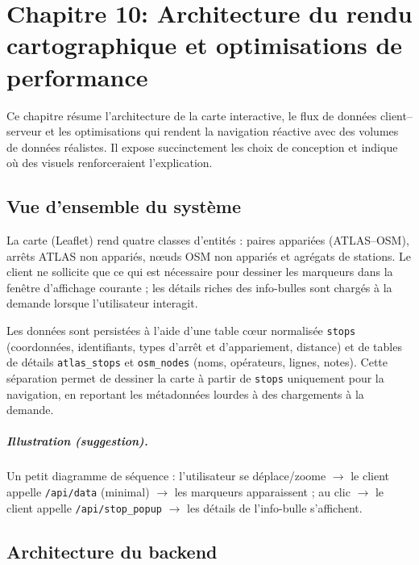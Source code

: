 \chapter{Chapitre 10: Architecture du rendu cartographique et optimisations de performance}

Ce chapitre résume l’architecture de la carte interactive, le flux de données client–serveur et les optimisations qui rendent la navigation réactive avec des volumes de données réalistes. Il expose succinctement les choix de conception et indique où des visuels renforceraient l’explication.

\section{Vue d’ensemble du système}
La carte (Leaflet) rend quatre classes d’entités : paires appariées (ATLAS–OSM), arrêts ATLAS non appariés, nœuds OSM non appariés et agrégats de stations. Le client ne sollicite que ce qui est nécessaire pour dessiner les marqueurs dans la fenêtre d’affichage courante ; les détails riches des info-bulles sont chargés à la demande lorsque l’utilisateur interagit.

Les données sont persistées à l’aide d’une table cœur normalisée \texttt{stops} (coordonnées, identifiants, types d’arrêt et d’appariement, distance) et de tables de détails \texttt{atlas\_stops} et \texttt{osm\_nodes} (noms, opérateurs, lignes, notes). Cette séparation permet de dessiner la carte à partir de \texttt{stops} uniquement pour la navigation, en reportant les métadonnées lourdes à des chargements à la demande.

\paragraph{Illustration (suggestion).} Un petit diagramme de séquence : l’utilisateur se déplace/zoome \(\rightarrow\) le client appelle \texttt{/api/data} (minimal) \(\rightarrow\) les marqueurs apparaissent ; au clic \(\rightarrow\) le client appelle \texttt{/api/stop\_popup} \(\rightarrow\) les détails de l’info-bulle s’affichent.

\section{Architecture du backend}
